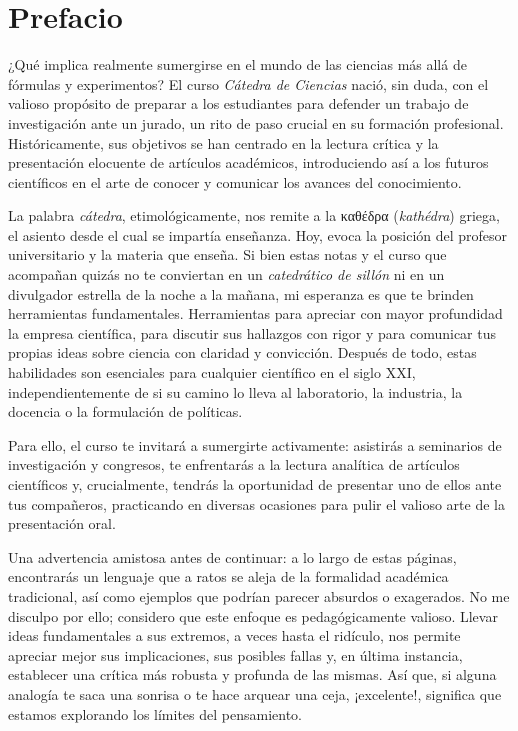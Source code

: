 \chapter{Prefacio}
\label{cha:prefacio}

¿Qué implica realmente sumergirse en el mundo de las ciencias más allá de
fórmulas y experimentos?
El curso \emph{Cátedra de Ciencias} nació, sin duda, con el valioso propósito de
preparar a los estudiantes para defender un trabajo de investigación ante un
jurado, un rito de paso crucial en su formación profesional.
Históricamente, sus objetivos se han centrado en la lectura crítica y la
presentación elocuente de artículos académicos, introduciendo así a los futuros
científicos en el arte de conocer y comunicar los avances del conocimiento.

La palabra \emph{cátedra}, etimológicamente, nos remite a la καθέδρα
(\emph{kathédra}) griega, el asiento desde el cual se impartía enseñanza.
Hoy, evoca la posición del profesor universitario y la materia que enseña.
Si bien estas notas y el curso que acompañan quizás no te conviertan en un
\emph{catedrático de sillón} ni en un divulgador estrella de la noche a la
mañana, mi esperanza es que te brinden herramientas fundamentales.
Herramientas para apreciar con mayor profundidad la empresa científica, para
discutir sus hallazgos con rigor y para comunicar tus propias ideas sobre
ciencia con claridad y convicción.
Después de todo, estas habilidades son esenciales para cualquier científico en
el siglo \textsc{XXI}, independientemente de si su camino lo lleva al
laboratorio, la industria, la docencia o la formulación de políticas.

Para ello, el curso te invitará a sumergirte activamente:
asistirás a seminarios de investigación y congresos, te enfrentarás a la lectura
analítica de artículos científicos y, crucialmente, tendrás la oportunidad de
presentar uno de ellos ante tus compañeros, practicando en diversas ocasiones
para pulir el valioso arte de la presentación oral.

Una advertencia amistosa antes de continuar:
a lo largo de estas páginas, encontrarás un lenguaje que a ratos se aleja de la
formalidad académica tradicional, así como ejemplos que podrían parecer absurdos
o exagerados.
No me disculpo por ello; considero que este enfoque es pedagógicamente valioso.
Llevar ideas fundamentales a sus extremos, a veces hasta el ridículo, nos
permite apreciar mejor sus implicaciones, sus posibles fallas y, en última
instancia, establecer una crítica más robusta y profunda de las mismas.
Así que, si alguna analogía te saca una sonrisa o te hace arquear una ceja,
¡excelente!, significa que estamos explorando los límites del pensamiento.

